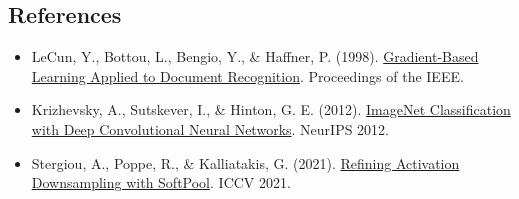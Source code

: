 \FloatBarrier
{}
\hypertarget{references-11}{%
\subsection{References}\label{references-11}}

\vspace{0.25em}
\begin{itemize}
\tightlist
\item
  LeCun, Y., Bottou, L., Bengio, Y., \& Haffner, P. (1998). \href{http://yann.lecun.com/exdb/publis/pdf/lecun-98.pdf}{Gradient-Based Learning Applied to Document Recognition}. Proceedings of the IEEE.
\item
  Krizhevsky, A., Sutskever, I., \& Hinton, G. E. (2012). \href{https://papers.nips.cc/paper/4824-imagenet-classification-with-deep-convolutional-neural-networks}{ImageNet Classification with Deep Convolutional Neural Networks}. NeurIPS 2012.
\item
  Stergiou, A., Poppe, R., \& Kalliatakis, G. (2021). \href{https://arxiv.org/abs/2101.00440}{Refining Activation Downsampling with SoftPool}. ICCV 2021.
\end{itemize}

\clearpage
